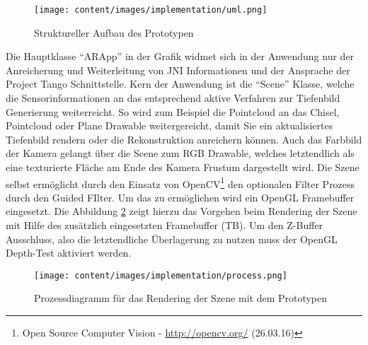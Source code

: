 \begin{figure}[h]
  \centering
	\texttt{[image: content/images/implementation/uml.png]} 
  \caption{Struktureller Aufbau des Prototypen}
  \label{fig:structure}
\end{figure}

Die Hauptklasse \enquote{ARApp} in der Grafik widmet sich in der Anwendung nur der Anreicherung und Weiterleitung von JNI Informationen und der Ansprache der Project Tango Schnittstelle. Kern der Anwendung ist die \enquote{Scene} Klasse, welche die Sensorinformationen an das entsprechend aktive Verfahren zur Tiefenbild Generierung weiterreicht. So wird zum Beispiel die Pointcloud an das Chisel, Pointcloud oder Plane Drawable weitergereicht, damit Sie ein aktualisiertes Tiefenbild rendern oder die Rekonstruktion anreichern können. Auch das Farbbild der Kamera gelangt über die Scene zum RGB Drawable, welches letztendlich als eine texturierte Fläche am Ende des Kamera Frustum dargestellt wird. Die Szene selbst ermöglicht durch den Einsatz von OpenCV\footnote{Open Source Computer Vision - \url{http://opencv.org/} (26.03.16)} den optionalen Filter Prozess durch den Guided FIlter. Um das zu ermöglichen wird ein OpenGL Framebuffer eingesetzt. Die Abbildung \ref{fig:rendering-process} zeigt hierzu das Vorgehen beim Rendering der Szene mit Hilfe des zusätzlich eingesetzten Framebuffer (TB). Um den Z-Buffer Ausschluss, also die letztendliche Überlagerung zu nutzen muss der OpenGL Depth-Test aktiviert werden.


\begin{figure}[h]
  \centering
	\texttt{[image: content/images/implementation/process.png]} 
  \caption{Prozessdiagramm für das Rendering der Szene mit dem Prototypen}
  \label{fig:rendering-process}
\end{figure}